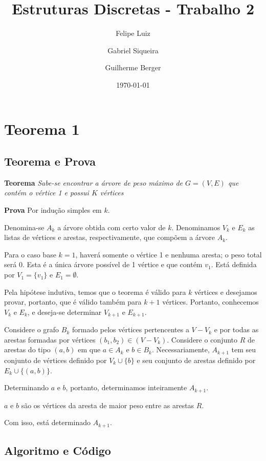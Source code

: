 \documentclass[a4paper]{article}
\title{Estruturas Discretas - Trabalho 2}
\author{Felipe Luiz \and Gabriel Siqueira \and Guilherme Berger}
\date{\today}
\begin{document}
\maketitle


\section*{Teorema 1}

\subsection*{Teorema e Prova}

\textbf{Teorema} \:
\textit{Sabe-se encontrar a árvore de peso máximo de $G=(V,E)$ que contém o vértice 1 e possui $K$ vértices}

\medskip
\noindent
\textbf{Prova} \:
Por indução simples em $k$.

Denomina-se $A_k$ a árvore obtida com certo valor de $k$. Denominamos $V_k$ e $E_k$ as listas de vértices e arestas, respectivamente, que compõem a árvore $A_k$.

Para o caso base $k=1$, haverá somente o vértice 1 e nenhuma aresta; o peso total será 0. Esta é a única árvore possível de 1 vértice e que contém $v_1$. Está definida por $V_1 = \{v_1\}$ e $E_1 = \emptyset$.

Pela hipótese indutiva, temos que o teorema é válido para $k$ vértices e desejamos provar, portanto, que é válido também para $k+1$ vértices. Portanto, conhecemos $V_k$ e $E_k$, e deseja-se determinar $V_{k+1}$ e $E_{k+1}$.

Considere o grafo $B_k$ formado pelos vértices pertencentes a $V - V_k$ e por todas as arestas formadas por vértices $(b_1, b_2) \in (V - V_k)$. Considere o conjunto $R$ de arestas do tipo $(a, b)$ em que $a \in A_k$ e $b \in B_k$. Necessariamente, $A_{k+1}$ tem seu conjunto de vértices definido por $V_k \cup \{b\}$ e seu conjunto de arestas definido por $E_k \cup \{(a, b)\}$.

Determinando $a$ e $b$, portanto, determinamos inteiramente $A_{k+1}$.

$a$ e $b$ são os vértices da aresta de maior peso entre as arestas $R$.

Com isso, está determinado $A_{k+1}$.

\subsection*{Algoritmo e Código}
\end{document}
